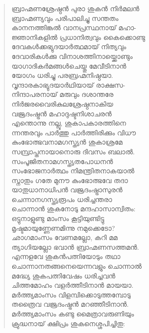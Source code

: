 \begin{verse}
ബ്രാഹ്മണശ്രേഷ്ഠന്‍ പുരാ ശുകന്‍ നിര്‍മലന്‍\\
ബ്രാഹ്മണ്യവും പരിപാലിച്ചു സന്തതം\\
കാനനത്തിങ്കല്‍ വാനപ്രസ്ഥനായ് മഹാ-\\
ജ്ഞാനികളില്‍ പ്രധാനിത്വവും കൈക്കൊണ്ടു\\
ദേവകള്‍ക്കഭ്യുദയാര്‍ത്ഥമായ് നിത്യവും\\
ദേവാരികള്‍ക്കു വിനാശത്തിനായ്ക്കൊണ്ടും\\
യാഗാദികര്‍മങ്ങള്‍ചെയ്തു മേവീടിനാന്‍\\
യോഗം ധരിച്ചു പരബ്രഹ്മനിഷ്ഠയാ.\\
വൃന്ദാരകാഭ്യുദയാര്‍ഥിയായ് രാക്ഷസ-\\
നിന്ദാപരനായ് മരുവും ദശാന്തരേ\\
നിര്‍ജരവൈരികുലശ്രേഷ്ഠനാകിയ\\
വജ്രദംഷ്ട്രന്‍ മഹാദുഷ്ടനിശാചരന്‍\\
എന്തൊന്നു നല്ലൂ, ശുകാപകാരത്തിനെ\\
ന്നന്തരവും പാര്‍ത്തു പാര്‍ത്തിരിക്കും വിധൗ\\
കുംഭോത്ഭവനാമഗസ്ത്യന്‍ ശുകാശ്രമേ\\
സമ്പ്രാപ്തനായാനൊരു ദിവസം ബലാല്‍.\\
സംപൂജിതനാമഗസ്ത്യതപോധനന്‍\\
സംഭോജനാര്‍ത്ഥം നിമന്ത്രിതനാകയാല്‍\\
സ്നാതും ഗതേ മുനൗ കുംഭോത്ഭവേ തദാ\\
യാതുധാനാധിപന്‍ വജ്രദംഷ്ട്രാസുരന്‍\\
ചെന്നാനഗസ്ത്യരൂപം ധരിച്ചന്തരാ\\
ചൊന്നാന്‍ ശുകനോടു മന്ദഹാസാന്വിതം:\\
ഒട്ടുനാളുണ്ടു മാംസം കൂട്ടിയുണ്ടിട്ടു\\
മൃഷ്ടമായുണ്ണേണമിന്നു നമുക്കെടോ?\\
ഛാഗമാംസം വേണമല്ലോ, കറി മമ\\
ത്യാഗിയല്ലോ ഭവാന്‍ ബ്രാഹ്മണസത്തമന്‍.\\
എന്നളവേ ശുകന്‍പത്നിയോടും തഥാ\\
ചൊന്നാനതങ്ങനെയെന്നവളും ചൊന്നാല്‍\\
മദ്ധ്യേ ശുകപത്നിവേഷം ധരിച്ചവന്‍\\
ചിത്തമോഹം വളര്‍ത്തീടിനാന്‍ മായയാ.\\
മര്‍ത്ത്യമാംസം വിളമ്പിക്കൊടുത്തമ്പോടു\\
തത്രൈവ വജ്രദംഷ്ട്രന്‍ മറഞ്ഞീടിനാന്‍.\\
മര്‍ത്ത്യമാംസം കണ്ടു മൈത്രാവരുണിയും\\
ക്രുദ്ധനായ് ക്ഷിപ്രം ശുകനെശ്ശപിച്ചിതു:\\

\end{verse}

